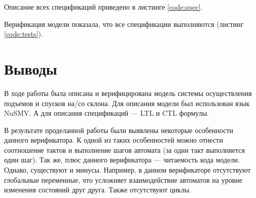 
\parindent=1cm


Описание всех спецификаций приведено в листинге \ref{code:spec}.



\parindent=1cm

Верификация модели показала, что все спецификации выполняются (листинг \ref{code:tests}).


\parindent=1cm

\newpage
\section{Выводы}
В ходе работы была описана и верифицирована модель системы осуществления подъемов и спусков на/со склона. Для описания модели был использован язык NuSMV. А для описания спецификаций --- LTL и CTL формулы.

В результате проделанной работы были выявлены некоторые особенности данного верификатора. К одной из таких особенностей можно отнести соотношение тактов и выполнение шагов автомата (за один такт выполняется один шаг). Так же, плюс данного верификатора --- читаемость кода модели. Однако, существуют и минусы. Например, в данном верификаторе отсутствуют глобальные переменные, что усложняет взаимодействие автоматов на уровне изменения состояний друг друга. Также отсутствуют циклы.


